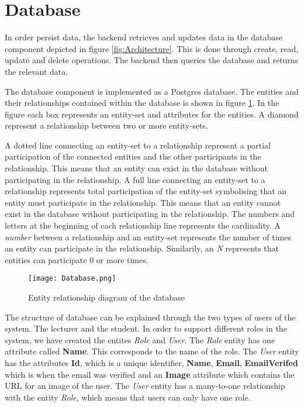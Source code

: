 \section{Database}
In order persist data, the backend retrieves and updates data in the database component depicted in figure \ref{fig:Architecture}. This is done through create, read, update and delete operations. 
The backend then queries the database and returns the relevant data. 

The database component is implemented as a Postgres database. The entities and their relationships contained within the database is shown in figure \ref{fig:Database}. In the figure each box represents an entity-set and attributes for the entities. A diamond represent a relationship between two or more entity-sets.

A dotted line connecting an entity-set to a relationship represent a partial participation of the connected entities and the other participants in the relationship. This means that an entity can exist in the database without participating in the relationship.
A full line connecting an entity-set to a relationship represents total participation of the entity-set symbolising that an entity must participate in the relationship. 
This means that an entity cannot exist in the database without participating in the relationship.
The numbers and letters at the beginning of each relationship line represents the cardinality. A \textit{number} between a relationship and an entity-set represents the number of times an entity can participate in the relationship. Similarily, an \textit{N} represents that entities can participate $0$ or more times.

\begin{figure}[H]
	\texttt{[image: Database.png]}
	\centering
	\caption{Entity relationship diagram of the database}
	\label{fig:Database}
\end{figure}

The structure of database can be explained through the two types of users of the system. The lecturer and the student.
In order to support different roles in the system, we have created the entites \textit{Role} and \textit{User}. The \textit{Role} entity has one attribute called \textbf{Name}. This corresponds to the name of the role. The \textit{User} entity has the attributes \textbf{Id}, which is a unique identifier, \textbf{Name}, \textbf{Email}, \textbf{EmailVerifed} which is when the email was verified and an \textbf{Image} attribute which contains the URL for an image of the user. The \textit{User} entity has a many-to-one relationship with the entity \textit{Role}, which means that users can only have one role.

